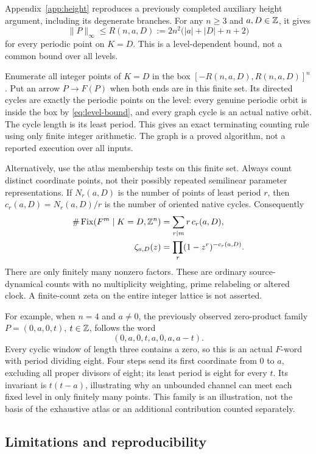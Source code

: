 Appendix~\ref{app:height} reproduces a previously completed auxiliary
height argument, including its degenerate branches. For any
$n\ge3$ and $a,D\in\mathbb Z$, it gives
\begin{equation}
 \|P\|_\infty\le R(n,a,D)
       :=2n^2\bigl(|a|+|D|+n+2\bigr)
 \label{eq:level-bound}
\end{equation}
for every periodic point on $K=D$. This is a level-dependent
bound, not a common bound over all levels.

Enumerate all integer points of $K=D$ in the box
$[-R(n,a,D),R(n,a,D)]^n$. Put an arrow $P\to F(P)$ when both
ends are in this finite set. Its directed cycles are exactly the
periodic points on the level: every genuine periodic orbit is inside
the box by \eqref{eq:level-bound}, and every graph cycle is an
actual native orbit. The cycle length is its least period. This
gives an exact terminating counting rule using only finite
integer arithmetic. The graph is a proved algorithm, not a
reported execution over all inputs.

Alternatively, use the atlas membership tests on this finite set.
Always count distinct coordinate points, not their possibly repeated
semilinear parameter representations. If $N_r(a,D)$ is the number
of points of least period $r$, then
$c_r(a,D)=N_r(a,D)/r$ is the number of oriented native cycles.
Consequently
\begin{align}
 \#\operatorname{Fix}(F^m\mid K=D,\mathbb Z^n)&=\sum_{r\mid m}r\,c_r(a,D),\\
 \zeta_{a,D}(z)&=\prod_r(1-z^r)^{-c_r(a,D)}.
 \label{eq:level-zeta}
\end{align}
There are only finitely many nonzero factors. These are ordinary
source-dynamical counts with no multiplicity weighting, prime
relabeling or altered clock. A finite-count zeta on the entire
integer lattice is not asserted.

For example, when $n=4$ and $a\ne0$, the previously observed
zero-product family $P=(0,a,0,t)$, $t\in\mathbb Z$, follows the word
\[
 (0,a,0,t,a,0,a,a-t).
\]
Every cyclic window of length three contains a zero, so this is
an actual $F$-word with period dividing eight. Four steps send
its first coordinate from $0$ to $a$, excluding all proper
divisors of eight; its least period is eight for every $t$.
Its invariant is $t(t-a)$, illustrating why an unbounded channel
can meet each fixed level in only finitely many points. This
family is an illustration, not the basis of the exhaustive atlas
or an additional contribution counted separately.

\subsection{Limitations and reproducibility}

